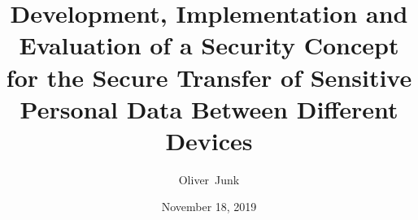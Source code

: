 
\title{Development, Implementation and Evaluation of a Security Concept for the Secure Transfer of Sensitive Personal Data Between Different Devices} 
\newcommand{\Year}{2019}
\date{November 18, \Year}
\newcommand{\thesisKind}{Master}
\newcommand{\degree}{Master~of~Science}
\newcommand{\versionnumber}{Final Version}
\let\origthelstnumber\thelstnumber
\makeatletter
\newcommand*\Suppressnumber{%
  \lst@AddToHook{OnNewLine}{%
    \let\thelstnumber\relax%
     \advance\c@lstnumber-\@ne\relax%
    }%
}

\newcommand*\Reactivatenumber{%
  \lst@AddToHook{OnNewLine}{%
   \let\thelstnumber\origthelstnumber%
   \advance\c@lstnumber\@ne\relax}%
}
\author{Oliver~Junk}
\newcommand{\matrikelno}{4568642}
\newcommand{\email}{oliver132@zedat.fu-berlin.de}

\newcommand{\supervisor}{Nicolas~Lehmann}
\newcommand{\supervisorUniversity}{Freie Universität Berlin}
\newcommand{\supervisorDepartment}{Dept. of Computer Science and Mathematics}
\newcommand{\supervisorAG}{Databases and Information Systems Group}
\newcommand{\supervisorCountry}{Germany}

\newcommand{\fstAdvisor}{Prof.~Dr.~Agnès~Voisard}
\newcommand{\fstAdvisorsUniversity}{Freie Universität Berlin} 
\newcommand{\fstAdvisorsDepartment}{Dept. of Computer Science and Mathematics} 
\newcommand{\fstAdvisorsAG}{Databases and Information Systems Group}
\newcommand{\fstAdvisorsCountry}{Germany}

\newcommand{\sndAdvisor}{Prof.~Dr.~Marian~Margraf}
\newcommand{\sndAdvisorsUniversity}{Freie Universität Berlin} %
\newcommand{\sndAdvisorsDepartment}{Dept. of Computer Science and Mathematics}
\newcommand{\sndAdvisorsAG}{ID-Management Group}
\newcommand{\sndAdvisorsCountry}{Germany}








\appendix





